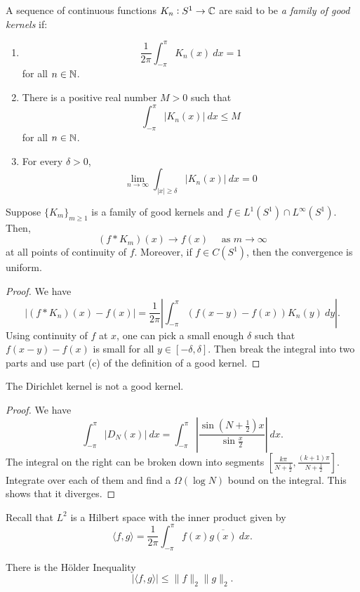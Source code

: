 \begin{definition}
    A sequence of continuous functions $K_n: S^1\to\mathbb{C}$ are said to be \emph{a family of good kernels} if:
    \begin{enumerate}[label=(\alph*)]
        \item $$\frac{1}{2\pi}\int_{-\pi}^\pi K_n(x)~dx = 1$$ for all $n\in\mathbb{N}$.
        \item There is a positive real number $M > 0$ such that 
        \begin{equation*}
            \int_{-\pi}^\pi |K_n(x)|~dx\le M
        \end{equation*}
        for all $n\in\mathbb{N}$.
        \item For every $\delta > 0$, 
        \begin{equation*}
            \lim_{n\to\infty}\int_{|x|\ge\delta}|K_n(x)|~dx  = 0
        \end{equation*}
    \end{enumerate}
\end{definition}

\begin{theorem}
    Suppose $\{K_m\}_{m\ge 1}$ is a family of good kernels and $f\in L^1(S^1)\cap L^\infty(S^1)$. Then, 
    \begin{equation*}
        (f\ast K_m)(x)\to f(x)\quad\text{ as } m\to\infty
    \end{equation*}
    at all points of continuity of $f$. Moreover, if $f\in C(S^1)$, then the convergence is uniform.
\end{theorem}
\begin{proof}
    We have 
    \begin{equation*}
        \left|(f\ast K_n)(x) - f(x)\right| = \frac{1}{2\pi}\left|\int_{-\pi}^\pi (f(x - y) - f(x))K_n(y)~dy\right|.
    \end{equation*}
    Using continuity of $f$ at $x$, one can pick a small enough $\delta$ such that $f(x - y) - f(x)$ is small for all $y\in [-\delta,\delta]$. Then break the integral into two parts and use part (c) of the definition of a good kernel.
\end{proof}

\begin{proposition}
    The Dirichlet kernel is not a good kernel.
\end{proposition}
\begin{proof}
    We have 
    \begin{equation*}
        \int_{-\pi}^\pi |D_N(x)|~dx = \int_{-\pi}^\pi\left|\frac{\sin\left( N + \frac{1}{2}\right)x}{\sin\frac{x}{2}}\right|~dx.
    \end{equation*}
    The integral on the right can be broken down into segments $\left[\frac{k\pi}{N + \frac{1}{2}}, \frac{(k + 1)\pi}{N + \frac{1}{2}}\right]$. Integrate over each of them and find a $\Omega(\log N)$ bound on the integral. This shows that it diverges.
\end{proof}

Recall that $L^2$ is a Hilbert space with the inner product given by 
\begin{equation*}
    \langle f, g\rangle = \frac{1}{2\pi}\int_{-\pi}^\pi f(x)\overline{g(x)}~dx.
\end{equation*}

There is the H\"older Inequality 
\begin{equation*}
    |\langle f, g\rangle|\le\|f\|_2\|g\|_2.
\end{equation*}